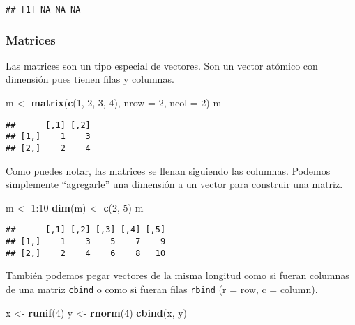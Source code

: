 \documentclass[]{article}
\newenvironment{Shaded}{\begin{snugshade}}{\end{snugshade}}
\newcommand{\KeywordTok}[1]{\textcolor[rgb]{0.13,0.29,0.53}{\textbf{{#1}}}}
\newcommand{\DataTypeTok}[1]{\textcolor[rgb]{0.13,0.29,0.53}{{#1}}}
\newcommand{\DecValTok}[1]{\textcolor[rgb]{0.00,0.00,0.81}{{#1}}}
\newcommand{\StringTok}[1]{\textcolor[rgb]{0.31,0.60,0.02}{{#1}}}
\newcommand{\NormalTok}[1]{{#1}}
\begin{document}
\begin{verbatim}
## [1] NA NA NA
\end{verbatim}

\subsubsection{Matrices}\label{matrices}

Las matrices son un tipo especial de vectores. Son un vector atómico con
dimensión pues tienen filas y columnas.

\begin{Shaded}
\begin{Highlighting}[]
\NormalTok{m <-}\StringTok{ }\KeywordTok{matrix}\NormalTok{(}\KeywordTok{c}\NormalTok{(}\DecValTok{1}\NormalTok{, }\DecValTok{2}\NormalTok{, }\DecValTok{3}\NormalTok{, }\DecValTok{4}\NormalTok{), }\DataTypeTok{nrow =} \DecValTok{2}\NormalTok{, }\DataTypeTok{ncol =} \DecValTok{2}\NormalTok{)}
\NormalTok{m}
\end{Highlighting}
\end{Shaded}

\begin{verbatim}
##      [,1] [,2]
## [1,]    1    3
## [2,]    2    4
\end{verbatim}

Como puedes notar, las matrices se llenan siguiendo las columnas.
Podemos simplemente ``agregarle'' una dimensión a un vector para
construir una matriz.

\begin{Shaded}
\begin{Highlighting}[]
\NormalTok{m <-}\StringTok{ }\DecValTok{1}\NormalTok{:}\DecValTok{10}
\KeywordTok{dim}\NormalTok{(m) <-}\StringTok{ }\KeywordTok{c}\NormalTok{(}\DecValTok{2}\NormalTok{, }\DecValTok{5}\NormalTok{)}
\NormalTok{m}
\end{Highlighting}
\end{Shaded}

\begin{verbatim}
##      [,1] [,2] [,3] [,4] [,5]
## [1,]    1    3    5    7    9
## [2,]    2    4    6    8   10
\end{verbatim}

También podemos pegar vectores de la misma longitud como si fueran
columnas de una matriz \texttt{cbind} o como si fueran filas
\texttt{rbind} (r = row, c = column).

\begin{Shaded}
\begin{Highlighting}[]
\NormalTok{x <-}\StringTok{ }\KeywordTok{runif}\NormalTok{(}\DecValTok{4}\NormalTok{)}
\NormalTok{y <-}\StringTok{ }\KeywordTok{rnorm}\NormalTok{(}\DecValTok{4}\NormalTok{)}
\KeywordTok{cbind}\NormalTok{(x, y)}
\end{Highlighting}
\end{Shaded}
\end{document}
